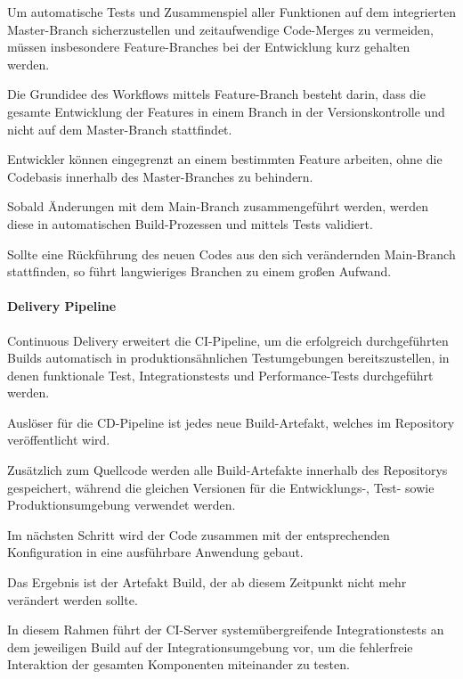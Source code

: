 Um automatische Tests und Zusammenspiel aller Funktionen auf dem integrierten Master-Branch sicherzustellen und zeitaufwendige Code-Merges zu vermeiden, müssen insbesondere Feature-Branches bei der Entwicklung kurz gehalten werden. \cite{meyer_continuous_2014}

Die Grundidee des Workflows mittels Feature-Branch besteht darin, dass die gesamte Entwicklung der Features in einem Branch in der Versionskontrolle und nicht auf dem Master-Branch stattfindet. \cite[S. 44 - 45]{verona_practical_2016} 

Entwickler können eingegrenzt an einem bestimmten Feature arbeiten, ohne die Codebasis innerhalb des Master-Branches zu behindern.  

Sobald Änderungen mit dem Main-Branch zusammengeführt werden, werden diese in automatischen Build-Prozessen und mittels Tests validiert. 

Sollte eine Rückführung des neuen Codes aus den sich verändernden Main-Branch stattfinden, so führt langwieriges Branchen zu einem großen Aufwand. \cite{juner_praxisbasierte_2017}  

\paragraph{Delivery Pipeline} 

Continuous Delivery erweitert die CI-Pipeline, um die erfolgreich durchgeführten Builds automatisch in produktionsähnlichen Testumgebungen bereitszustellen, in denen funktionale Test, Integrationstests und Performance-Tests durchgeführt werden. \cite[S. 17]{sharma_devops_2017}

Auslöser für die CD-Pipeline ist jedes neue Build-Artefakt, welches im Repository veröffentlicht wird.

Zusätzlich zum Quellcode werden alle Build-Artefakte innerhalb des Repositorys gespeichert, während die gleichen Versionen für die Entwicklungs-, Test- sowie Produktionsumgebung verwendet werden. \cite[S. 109 - 110]{kim_devops-handbuch_2017}

Im nächsten Schritt wird der Code zusammen mit der entsprechenden Konfiguration in eine ausführbare Anwendung gebaut. 

Das Ergebnis ist der Artefakt Build, der ab diesem Zeitpunkt nicht mehr verändert werden sollte. 

In diesem Rahmen führt der CI-Server systemübergreifende Integrationstests an dem jeweiligen Build auf der Integrationsumgebung vor, um die fehlerfreie Interaktion der gesamten Komponenten miteinander zu testen. \cite[S. 122]{kim_devops-handbuch_2017} 

